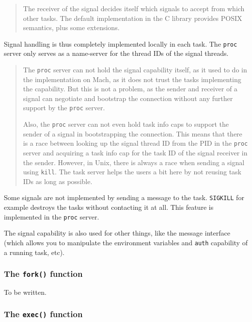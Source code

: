 \documentclass[9pt,a4paper]{extarticle}
\newenvironment{comment}{\footnotesize \begin{quote}}{\end{quote}}
\begin{document}
\begin{comment}
  The receiver of the signal decides itself which signals to accept
  from which other tasks.  The default implementation in the C library
  provides POSIX semantics, plus some extensions.
\end{comment}

Signal handling is thus completely implemented locally in each task.
The \texttt{proc} server only serves as a name-server for the thread
IDs of the signal threads.

\begin{comment}
  The \texttt{proc} server can not hold the signal capability itself,
  as it used to do in the implementation on Mach, as it does not trust
  the tasks implementing the capability.  But this is not a problem,
  as the sender and receiver of a signal can negotiate and bootstrap
  the connection without any further support by the \texttt{proc}
  server.
  
  Also, the \texttt{proc} server can not even hold task info caps to
  support the sender of a signal in bootstrapping the connection.
  This means that there is a race between looking up the signal thread
  ID from the PID in the \texttt{proc} server and acquiring a task
  info cap for the task ID of the signal receiver in the sender.
  However, in Unix, there is always a race when sending a signal using
  \verb/kill/.  The task server helps the users a bit here by not
  reusing task IDs as long as possible.
\end{comment}

Some signals are not implemented by sending a message to the task.
\verb/SIGKILL/ for example destroys the tasks without contacting it at
all.  This feature is implemented in the \texttt{proc} server.

The signal capability is also used for other things, like the message
interface (which allows you to manipulate the environment variables
and \texttt{auth} capability of a running task, etc).


\subsubsection{The \texttt{fork()} function}

To be written.


\subsubsection{The \texttt{exec()} function}
\end{document}
